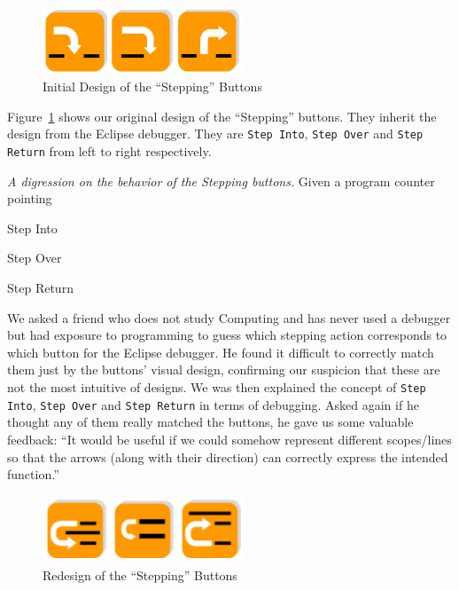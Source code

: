 \documentclass[11pt, a4paper]{article}
\newcommand{\cmd}[1]{{\tt #1}}
\begin{document}
\begin{figure}[h!]
\centering
\includegraphics[height=20mm,width=60mm]{buttons1.png}
\caption{Initial Design of the ``Stepping'' Buttons}
\label{fig:button1}
\end{figure}

Figure~\ref{fig:button1} shows our original design of the ``Stepping'' buttons.
They inherit the design from the Eclipse debugger.
They are \cmd{Step Into}, \cmd{Step Over} and \cmd{Step Return} from left to right respectively.

\begin{framed}
\emph{A digression on the behavior of the Stepping buttons.}
Given a program counter pointing
\begin{description}
\item Step Into
\item Step Over
\item Step Return
\end{description}

\end{framed}


We asked a friend who does not study Computing and has never used a debugger but had exposure to programming to guess which stepping action corresponds to which button for the Eclipse debugger.
He found it difficult to correctly match them just by the buttons' visual design, confirming our suspicion that these are not the most intuitive of designs.
We was then explained the concept of \cmd{Step Into}, \cmd{Step Over} and \cmd{Step Return} in terms of debugging. Asked again if he thought any of them really matched the buttons, he gave us some valuable feedback: ``It would be useful if we could somehow represent different scopes/lines so that the arrows (along with their direction) can correctly express the intended function.''
\begin{figure}[h!]
\centering
\includegraphics[height=20mm,width=60mm]{buttons2.png}
\caption{Redesign of the ``Stepping'' Buttons}
\label{fig:buttons2}
\end{figure}
\end{document}
